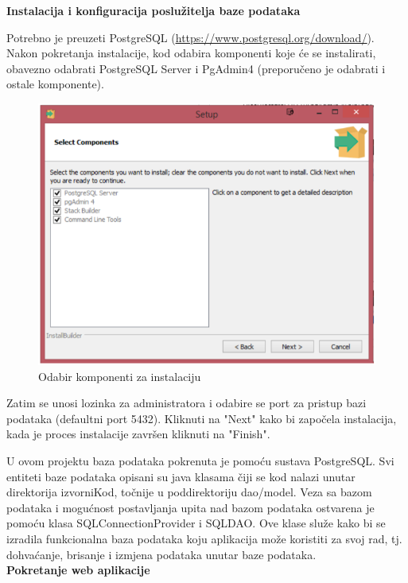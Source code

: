 	 \textbf{Instalacija i konfiguracija poslužitelja baze podataka}
		

			Potrebno je preuzeti PostgreSQL (\underline{\url{https://www.postgresql.org/download/}}). Nakon pokretanja instalacije, kod odabira komponenti koje će se instalirati, obavezno odabrati PostgreSQL Server i PgAdmin4 (preporučeno je odabrati i ostale komponente).
			
			\begin{figure}[H]
				\includegraphics[scale=0.65]{Slike/Instalacija.png}
				\centering
				\caption{Odabir komponenti za instalaciju}
				\label{fig:dijagram}
			\end{figure}
			
			Zatim se unosi lozinka za administratora i odabire se port za pristup bazi podataka (defaultni port 5432). Kliknuti na "Next" kako bi započela instalacija, kada je proces instalacije završen kliknuti na "Finish".
			
			 U ovom projektu baza podataka pokrenuta je pomoću sustava PostgreSQL. Svi entiteti baze podataka opisani su java klasama čiji se kod nalazi unutar direktorija izvorniKod, točnije u poddirektoriju dao/model. Veza sa bazom podataka i mogućnost postavljanja upita nad bazom podataka ostvarena je pomoću klasa SQLConnectionProvider i SQLDAO. Ove klase služe kako bi se izradila funkcionalna baza podataka koju aplikacija može koristiti za svoj rad, tj. dohvaćanje, brisanje i izmjena podataka unutar baze podataka.
			 \\	
			 
			\textbf{Pokretanje web aplikacije}
			\\		
	
